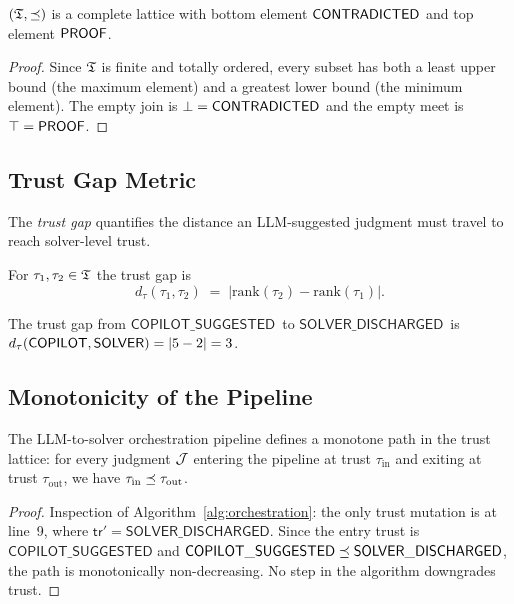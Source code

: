 \documentclass[11pt]{article}
\newcommand{\CopilotSugg}{\ensuremath{\mathsf{COPILOT\_SUGGESTED}}}
\newcommand{\SolverDisch}{\ensuremath{\mathsf{SOLVER\_DISCHARGED}}}
\newcommand{\tr}{\mathsf{tr}}                        %
\newcommand{\trank}{\mathrm{rank}}
\newcommand{\tgap}{d_{\tau}}
\begin{document}
\begin{theorem}[Completeness]\label{thm:complete-lattice}
$(\mathfrak{T}, \preceq)$ is a complete lattice with bottom element $\mathsf{CONTRADICTED}$ and
top element $\mathsf{PROOF}$.
\end{theorem}

\begin{proof}
Since $\mathfrak{T}$ is finite and totally ordered, every subset has both a
least upper bound (the maximum element) and a greatest lower bound
(the minimum element).  The empty join is $\bot = \mathsf{CONTRADICTED}$ and the
empty meet is $\top = \mathsf{PROOF}$.
\end{proof}

\subsection{Trust Gap Metric}

The \emph{trust gap} quantifies the distance an LLM-suggested judgment
must travel to reach solver-level trust.

\begin{definition}\label{def:trust-gap}
For $\tau_1, \tau_2 \in \mathfrak{T}$ the trust gap is
\[
  \tgap(\tau_1, \tau_2) \;=\; |\trank(\tau_2) - \trank(\tau_1)|.
\]
\end{definition}

\begin{corollary}\label{cor:copilot-solver-gap}
The trust gap from \CopilotSugg\ to \SolverDisch\ is
$\tgap(\Tcopilot, \Tsolver) = |5 - 2| = 3$.
\end{corollary}

\subsection{Monotonicity of the Pipeline}

\begin{theorem}\label{thm:monotone-path}
The LLM-to-solver orchestration pipeline defines a monotone path in the
trust lattice: for every judgment $\mathcal{J}$ entering the pipeline at trust
$\tau_{\mathrm{in}}$ and exiting at trust $\tau_{\mathrm{out}}$, we have
$\tau_{\mathrm{in}} \preceq \tau_{\mathrm{out}}$.
\end{theorem}

\begin{proof}
Inspection of Algorithm~\ref{alg:orchestration}: the only trust
mutation is at line~9, where $\tr' = \SolverDisch$.  Since the entry
trust is $\CopilotSugg$ and $\CopilotSugg \tleq \SolverDisch$, the
path is monotonically non-decreasing.  No step in the algorithm
downgrades trust.
\end{proof}
\end{document}

